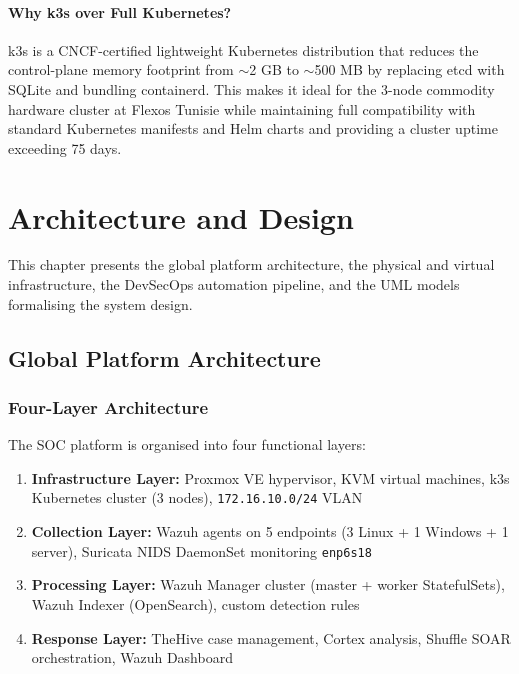 \documentclass[12pt,a4paper]{report}
\begin{document}
\subsubsection{Why k3s over Full Kubernetes?}

k3s is a CNCF-certified lightweight Kubernetes distribution that reduces the control-plane memory footprint from $\sim$2 GB to $\sim$500 MB by replacing etcd with SQLite and bundling containerd. This makes it ideal for the 3-node commodity hardware cluster at Flexos Tunisie while maintaining full compatibility with standard Kubernetes manifests and Helm charts and providing a cluster uptime exceeding 75 days.

\chapter{Architecture and Design}
\minitoc
\vspace{1cm}

This chapter presents the global platform architecture, the physical and virtual infrastructure, the DevSecOps automation pipeline, and the UML models formalising the system design.

\section{Global Platform Architecture}

\subsection{Four-Layer Architecture}

The SOC platform is organised into four functional layers:

\begin{enumerate}
  \item \textbf{Infrastructure Layer:} Proxmox VE hypervisor, KVM virtual machines, k3s Kubernetes cluster (3 nodes), \texttt{172.16.10.0/24} VLAN
  \item \textbf{Collection Layer:} Wazuh agents on 5 endpoints (3 Linux + 1 Windows + 1 server), Suricata NIDS DaemonSet monitoring \texttt{enp6s18}
  \item \textbf{Processing Layer:} Wazuh Manager cluster (master + worker StatefulSets), Wazuh Indexer (OpenSearch), custom detection rules
  \item \textbf{Response Layer:} TheHive case management, Cortex analysis, Shuffle SOAR orchestration, Wazuh Dashboard
\end{enumerate}
\end{document}
